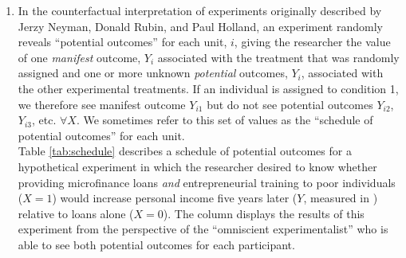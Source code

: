 \documentclass[a4paper,12pt]{article}
\begin{document}
\begin{enumerate}\itemsep1em

\subsection*{The Omniscient Experimentalist}

\item In the counterfactual interpretation of experiments originally described by Jerzy Neyman, Donald Rubin, and Paul Holland, an experiment randomly reveals ``potential outcomes'' for each unit, $i$, giving the researcher the value of one \textit{manifest} outcome, $Y_{i}$ associated with the treatment that was randomly assigned and one or more unknown \textit{potential} outcomes, $Y_{i}$, associated with the other experimental treatments. If an individual is assigned to condition 1, we therefore see manifest outcome $Y_{i1}$ but do not see potential outcomes $Y_{i2}$, $Y_{i3}$, etc. $\forall X$. We sometimes refer to this set of values as the ``schedule of potential outcomes'' for each unit.\\

\noindent Table \ref{tab:schedule} describes a schedule of potential outcomes for a hypothetical experiment in which the researcher desired to know whether providing microfinance loans \textit{and} entrepreneurial training to poor individuals ($X = 1$) would increase personal income five years later ($Y$, measured in \textsterling) relative to loans alone ($X = 0$). The column displays the results of this experiment from the perspective of the ``omniscient experimentalist'' who is able to see both potential outcomes for each participant.


\end{enumerate}
\end{document}
